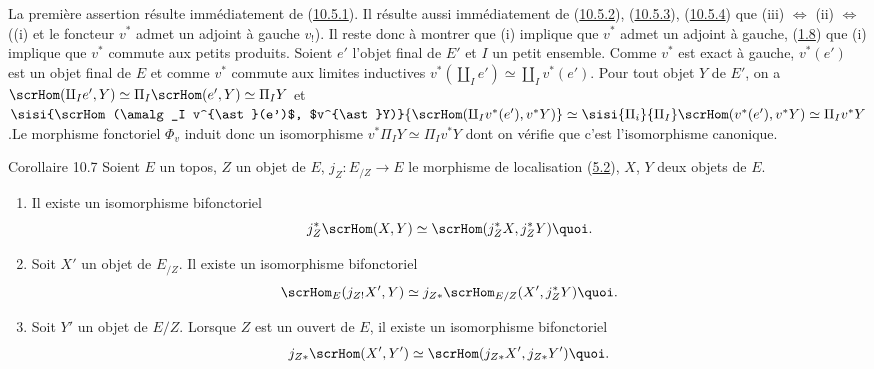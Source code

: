 \documentclass[10pt]{../fichiers-configuration-latex/smfart}
\begin{document}
\subsubsection{}
La première assertion résulte immédiatement de
(\hyperref[IV.subsubsec10.5.1]{10.5.1}). Il résulte aussi immédiatement de
(\hyperref[IV.subsubsec10.5.2]{10.5.2}), (\hyperref[IV.subsubsec10.5.3]{10.5.3}),
(\hyperref[IV.subsubsec10.5.4]{10.5.4}) que (iii) $\Leftrightarrow$ (ii)
$\Leftrightarrow$ ((i) et le foncteur $v^{\ast}$ admet un adjoint à
gauche $v_{!}$). Il reste donc à montrer que (i) implique que
$v^{\ast}$ admet un adjoint à gauche, \ie (\hyperref[IV.rem1.8]{1.8}) que (i)
implique que $v^{\ast}$ commute aux petits produits. Soient $e'$
l'objet final de $E'$ et $I$ un petit ensemble. Comme $v^{\ast}$ est
exact à gauche, $v^{\ast}(e')$ est un objet final de $E$ et comme
$v^{\ast}$ commute aux limites inductives $v^{\ast}(\amalg_I
e')\simeq \amalg_I v^{\ast}(e')$. Pour tout objet $Y$ de $E'$, on a
$\scrHom(\amalg_I e', Y)\simeq \Pi_I\scrHom(e',Y)\simeq \Pi_I Y$ et
$\sisi{\scrHom(\amalg_I v^{\ast}(e')$, $v^{\ast}Y)}
{\scrHom(\amalg_I v^{\ast}(e'),v^{\ast}Y)}\simeq
\sisi{\Pi_i}{\Pi_I}\scrHom(v^{\ast}(e'), v^{\ast}Y)\simeq \Pi_I
v^{\ast}Y$.\pageoriginale Le morphisme fonctoriel $\Phi_v$ induit
donc un isomorphisme $v^{\ast}\Pi_I Y\simeq \Pi_I v^{\ast}Y$ dont on
vérifie que c'est l'isomorphisme canonique. \cqfd

\begin{enonce*}{Corollaire 10.7}
Soient $E$ un topos, $Z$ un objet de $E$, $j_Z:E_{/Z}\rightarrow E$
le morphisme de localisation (\hyperref[IV.subsec5.2]{5.2}), $X$, $Y$
deux objets de $E$.
\begin{enumerate}
\renewcommand{\labelenumi}{\theenumi)}
\item Il existe un isomorphisme bifonctoriel
$$
j^{\ast}_Z\scrHom(X,Y)\simeq \scrHom(j^{\ast}_ZX,
j^{\ast}_ZY){\quoi}.
$$

\item Soit $X'$ un objet de $E_{/Z}$. Il existe un isomorphisme
bifonctoriel
$$
\scrHom_E(j_{Z!}X',Y)\simeq j_{Z\ast}\scrHom_{E/Z}(X',j^{\ast}_Z
Y){\quoi}.
$$

\item Soit $Y'$ un objet de $E/Z$. Lorsque $Z$ est un ouvert de $E$,
il existe un isomorphisme bifonctoriel
$$
j_{Z\ast}\scrHom(X',Y')\simeq \scrHom(j_{Z\ast}X',
j_{Z\ast}Y'){\quoi}.
$$
\end{enumerate}
\end{enonce*}
\end{document}
